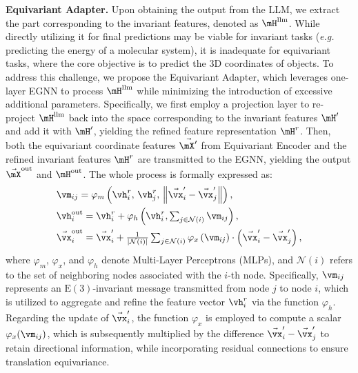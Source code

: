 \textbf{Equivariant Adapter.} Upon obtaining the output from the LLM, we extract the part corresponding to the invariant features, denoted as $\mH^{\text{llm}}$. While directly utilizing it for final predictions may be viable for invariant tasks (\emph{e.g.} predicting the energy of a molecular system), it is inadequate for equivariant tasks, where the core objective is to predict the 3D coordinates of objects. To address this challenge, we propose the Equivariant Adapter, which leverages one-layer EGNN to process $\mH^{\text{llm}}$ while minimizing the introduction of excessive additional parameters. Specifically, we first employ a projection layer to re-project $\mH^{\text{llm}}$ back into the space corresponding to the invariant features $\mH'$ and add it with $\mH'$, yielding the refined feature representation $\mH^{r}$. Then, both the equivariant coordinate features $\Vec{\mX'}$ from Equivariant Encoder and the refined invariant features $\mH^{r}$ are transmitted to the EGNN, yielding the output $\Vec{\mX}^{\text{out}}$ and $\mH^{\text{out}}$. The whole process is formally expressed as:
\begin{equation}\label{eq:EA}
\begin{aligned}
    &\vm_{ij} = \varphi_m \left(\vh_{i}^{r},\, \vh_{j}^{r},\, \left\| \vec{\vx}'_{i} - \vec{\vx}'_{j} \right\|\right), \\
    &\vh_{i}^{\text{out}}  = \textstyle\vh_{i}^{r} + \varphi_{h}\left(\vh_{i}^{r},\sum_{j \in \mathcal{N}(i)}\vm_{ij}\right), \\
    &\vec{\vx}_{i}^{\text{out}} = \textstyle\vec{\vx}'_{i}+\frac{1}{|\mathcal{N}(i)|}\sum_{j \in \mathcal{N}(i)}\varphi_{x} \left(\vm_{ij}\right)\cdot\left(\vec{\vx}'_{i}-\vec{\vx}'_{j}\right), \\ 
\end{aligned}
\end{equation}
where $\varphi_{m}$, $\varphi_{x}$, and $\varphi_{h}$ denote Multi-Layer Perceptrons (MLPs), and $\mathcal{N}(i)$ refers to the set of neighboring nodes associated with the $i$-th node. Specifically, $\vm_{ij}$ represents an $\mathrm{E}(3)$-invariant message transmitted from node $j$ to node $i$, which is utilized to aggregate and refine the feature vector $\vh_{i}^{r}$ via the function $\varphi_{h}$. Regarding the update of $\vec{\vx}'_{i}$, the function $\varphi_{x}$ is employed to compute a scalar $\varphi_{x} (\vm_{ij})$, which is subsequently multiplied by the difference $\vec{\vx}'_{i} - \vec{\vx}'_{j}$ to retain directional information, while incorporating residual connections to ensure translation equivariance.


